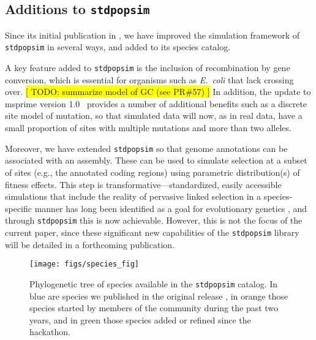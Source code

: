 \documentclass[hidelinks]{article}
\newcommand{\stdpopsim}{\texttt{stdpopsim}\xspace}
\begin{document}


\subsection*{Additions to \stdpopsim}
    \label{sec:expanded-catalog}

Since its initial publication in \cite{Adrion2020},
we have improved the simulation framework of \stdpopsim in several ways,
and added to its species catalog.

A key feature added to \stdpopsim
is the inclusion of recombination by gene conversion,
which is essential for organisms such as \textit{E.\ coli}
that lack crossing over.
\colorbox{yellow}{[ TODO: summarize model of GC (see PR\#57) ]}
In addition, the update to msprime version 1.0~\citep{Baumdicker2022}
provides a number of additional benefits such as a discrete site model of mutation,
so that simulated data will now, as in real data,
have a small proportion of sites with multiple mutations and more than two alleles.

Moreover, we have extended \stdpopsim so that
genome annotations can be associated with an assembly.
These can be used to simulate selection at a subset of sites (e.g., the annotated coding regions)
using parametric distribution(s) of fitness effects.
This step is transformative---standardized, easily accessible simulations
that include the reality of pervasive linked selection in a species-specific
manner has long been identified as a goal for evolutionary genetics
\cite[e.g.,][]{McVicker2009,comeron2014background}, and through \stdpopsim
this is now achievable.
However, this is not the focus of the current paper, since
these significant new capabilities of the \stdpopsim library will be detailed in a forthcoming publication.

\begin{figure}
    \texttt{[image: figs/species\_fig]}
	\caption{Phylogenetic tree of species available in the \stdpopsim catalog.
		In blue are species we published in the original release \citep{Adrion2020}, in orange those 
		species started by members of the community during the past two years, and in green those species
		added or refined since the hackathon.
	\label{fig:tree} }
\end{figure}
\end{document}
